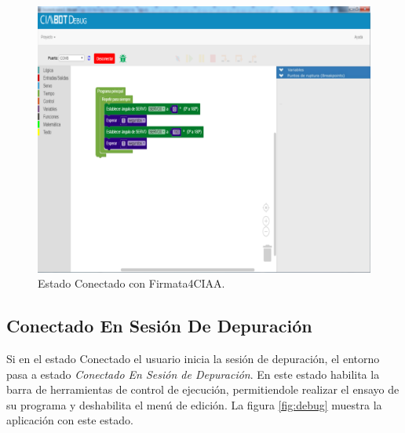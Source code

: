 \begin{figure}[!htbp]
	\begin{center}  %
		\includegraphics[width=15cm]{./Figures/debug-conectado.png}
		\par\caption{Estado Conectado con Firmata4CIAA.}\label{fig:conectado}
	\end{center}
\end{figure}

\subsection{Conectado En Sesión De Depuración}
\label{subsec:Conectado En Sesion De Depuración}

Si en el estado Conectado el usuario inicia la sesión de depuración, el entorno pasa a estado \emph{Conectado En Sesión de Depuración}. En este estado habilita la barra de herramientas de control de ejecución, permitiendole realizar el ensayo de su programa y deshabilita el menú de edición. La figura \ref{fig:debug} muestra la aplicación con este estado.

